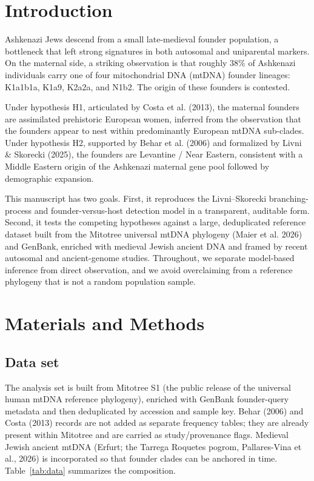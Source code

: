 \documentclass[11pt]{article}
\begin{document}
\section{Introduction}
Ashkenazi Jews descend from a small late-medieval founder population, a bottleneck that left strong signatures in both autosomal and uniparental markers. On the maternal side, a striking observation is that roughly 38\% of Ashkenazi individuals carry one of four mitochondrial DNA (mtDNA) founder lineages: K1a1b1a, K1a9, K2a2a, and N1b2. The origin of these founders is contested.

Under hypothesis H1, articulated by Costa et al. (2013), the maternal founders are assimilated prehistoric European women, inferred from the observation that the founders appear to nest within predominantly European mtDNA sub-clades. Under hypothesis H2, supported by Behar et al. (2006) and formalized by Livni \& Skorecki (2025), the founders are Levantine / Near Eastern, consistent with a Middle Eastern origin of the Ashkenazi maternal gene pool followed by demographic expansion.

This manuscript has two goals. First, it reproduces the Livni--Skorecki branching-process and founder-versus-host detection model in a transparent, auditable form. Second, it tests the competing hypotheses against a large, deduplicated reference dataset built from the Mitotree universal mtDNA phylogeny (Maier et al. 2026) and GenBank, enriched with medieval Jewish ancient DNA and framed by recent autosomal and ancient-genome studies. Throughout, we separate model-based inference from direct observation, and we avoid overclaiming from a reference phylogeny that is not a random population sample.

\section{Materials and Methods}
\subsection{Data set}
The analysis set is built from Mitotree S1 (the public release of the universal human mtDNA reference phylogeny), enriched with GenBank founder-query metadata and then deduplicated by accession and sample key. Behar (2006) and Costa (2013) records are not added as separate frequency tables; they are already present within Mitotree and are carried as study/provenance flags. Medieval Jewish ancient mtDNA (Erfurt; the Tarrega Roquetes pogrom, Pallares-Vina et al., 2026) is incorporated so that founder clades can be anchored in time. Table~\ref{tab:data} summarizes the composition.
\end{document}
